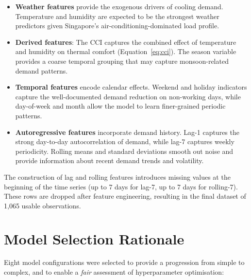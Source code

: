\begin{itemize}
    \item \textbf{Weather features} provide the exogenous drivers of cooling demand. Temperature and humidity are expected to be the strongest weather predictors given Singapore's air-conditioning-dominated load profile.
    
    \item \textbf{Derived features}: The CCI captures the combined effect of temperature and humidity on thermal comfort (Equation~\ref{eq:cci}). The season variable provides a coarse temporal grouping that may capture monsoon-related demand patterns.
    
    \item \textbf{Temporal features} encode calendar effects. Weekend and holiday indicators capture the well-documented demand reduction on non-working days, while day-of-week and month allow the model to learn finer-grained periodic patterns.
    
    \item \textbf{Autoregressive features} incorporate demand history. Lag-1 captures the strong day-to-day autocorrelation of demand, while lag-7 captures weekly periodicity. Rolling means and standard deviations smooth out noise and provide information about recent demand trends and volatility.
\end{itemize}

The construction of lag and rolling features introduces missing values at the beginning of the time series (up to 7 days for lag-7, up to 7 days for rolling-7). These rows are dropped after feature engineering, resulting in the final dataset of 1,065 usable observations.


\section{Model Selection Rationale}

Eight model configurations were selected to provide a progression from simple to complex, and to enable a \emph{fair} assessment of hyperparameter optimisation:

